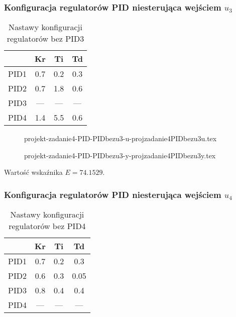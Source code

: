 \subsubsection{Konfiguracja regulatorów PID niesterująca wejściem $u_{3}$}
\begin{table}[H]
    \centering
    \begin{tabular}{|l|c|c|c|}
    \hline
         & Kr  & Ti  & Td  \\ \hline
    PID1 & 0.7 & 0.2 & 0.3 \\ \hline
    PID2 & 0.7 & 1.8 & 0.6  \\ \hline
    PID3 & --- & --- & --- \\ \hline
    PID4 & 1.4 & 5.5 & 0.6 \\ \hline
    \end{tabular}
    \caption[H]{Nastawy konfiguracji regulatorów bez PID3}
\end{table}


\ifdefined\CompileFigures
    \begin{figure}[H] 
        \centering
        
        \caption{projekt-zadanie4-PID-PIDbezu3-u-projzadanie4PIDbezu3u.tex}
        \label{projekt:zad4:figure:projzadanie4PIDbezu3u}
    \end{figure}
\fi

\ifdefined\CompileFigures
    \begin{figure}[H] 
        \centering
        
        \caption{projekt-zadanie4-PID-PIDbezu3-y-projzadanie4PIDbezu3y.tex}
        \label{projekt:zad4:figure:projzadanie4PIDbezu3y}
    \end{figure}
\fi

Wartość wskaźnika $E=\num{74.1529}$.

\subsubsection{Konfiguracja regulatorów PID niesterująca wejściem $u_{4}$}

\begin{table}[H]
    \centering
    \begin{tabular}{|l|c|c|c|}
    \hline
         & Kr  & Ti  & Td  \\ \hline
    PID1 & 0.7 & 0.2 & 0.3 \\ \hline
    PID2 & 0.6 & 0.3 & 0.05 \\ \hline
    PID3 & 0.8 & 0.4 & 0.4 \\ \hline
    PID4 & --- & --- & --- \\ \hline
    \end{tabular}
    \caption[H]{Nastawy konfiguracji regulatorów bez PID4}
\end{table}

